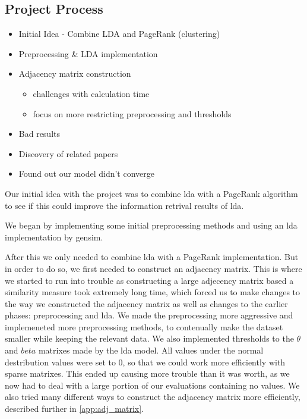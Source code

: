 \subsection{Project Process}
\begin{itemize}
	\item Initial Idea - Combine LDA and PageRank (clustering)
	\item Preprocessing \& LDA implementation
	\item Adjacency matrix construction
	\begin{itemize}
		\item challenges with calculation time
		\item focus on more restricting preprocessing and thresholds
	\end{itemize}
	\item Bad results
	\item Discovery of related papers
	\item Found out our model didn't converge
\end{itemize}

Our initial idea with the project was to combine \gls{lda} with a PageRank algorithm to see if this could improve the information retrival results of \gls{lda}.

We began by implementing some initial preprocessing methods and using an \gls{lda} implementation by gensim.

After this we only needed to combine \gls{lda} with a PageRank implementation. But in order to do so, we first needed to construct an adjacency matrix. This is where we started to run into trouble as constructing a large adjecency matrix based a similarity measure took extremely long time, which forced us to make changes to the way we constructed the adjacency matrix as well as changes to the earlier phases: preprocessing and \gls{lda}.
We made the preprocessing more aggressive and implemeneted more preprocessing methods, to contenually make the dataset smaller while keeping the relevant data.
We also implemented thresholds to the $\theta$ and $beta$ matrixes made by the \gls{lda} model. All values under the normal destribution values were set to 0, so that we could work more efficiently with sparse matrixes.
This ended up causing more trouble than it was worth, as we now had to deal with a large portion of our evaluations containing no values.
We also tried many different ways to construct the adjacency matrix more efficiently, described further in \autoref{app:adj_matrix}.

